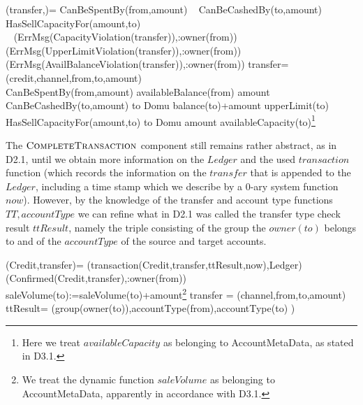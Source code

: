 \begin{asm}
(transfer,)=\+
   \IF CanBeSpentBy(from,amount) \+
      \THEN ~ \IF CanBeCashedBy(to,amount) \+
         \THEN ~ \IF HasSellCapacityFor(amount,to) \+
            \THEN ~  \\
            \ELSE 
             ~ (ErrMsg(CapacityViolation(transfer)),\TO :owner(from))\-
         \ELSE 
         ~ (ErrMsg(UpperLimitViolation(transfer)),\TO :owner(from))\-
      \ELSE 
      ~ (ErrMsg(AvailBalanceViolation(transfer)),\TO :owner(from))\dec\-
      \WHERE \+
transfer=(credit,channel,from,to,amount)\\
CanBeSpentBy(from,amount) \IFF availableBalance(from) \geq amount \\
CanBeCashedBy(to,amount) \IFF  
    to \not \in Domu \AND balance(to)+amount \leq upperLimit(to) \\
 HasSellCapacityFor(amount,to) \IFF  to \not \in Domu \AND   amount \leq availableCapacity(to)\footnote{Here we treat $availableCapacity$ as belonging to AccountMetaData, as stated in D3.1.}
\end{asm}


The $\hbox{\sc CompleteTransaction}$ component still remains rather abstract, as in D2.1, until we obtain more information on the $Ledger$ and the used  $transaction$ function (which records the information on the $transfer$ that is appended to the $Ledger$, including a time stamp which we describe by a 0-ary system function $now$). However, by the knowledge of the transfer and account type functions $TT, accountType$ we can refine what in D2.1 was called the transfer type check result $ttResult$, namely the triple consisting of the group the $owner(to)$ belongs to and of the $accountType$ of the source and target accounts.

\begin{asm}
(Credit,transfer)=\+   
   (transaction(Credit,transfer,ttResult,now),Ledger)\\
   (Confirmed(Credit,transfer),\TO :owner(from))\\
   saleVolume(to):=saleVolume(to)+amount\footnote{We treat the dynamic function $saleVolume$ as belonging to AccountMetaData, apparently in accordance with D3.1.} \-
\WHERE \+
 transfer = (channel,from,to,amount)\\
 ttResult= (group(owner(to)),accountType(from),accountType(to) )
\end{asm}



